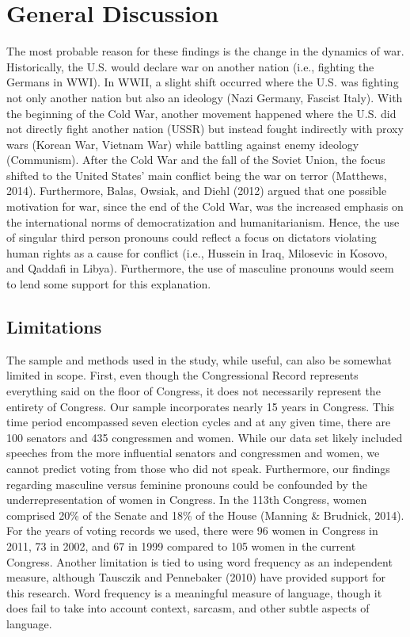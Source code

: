 \documentclass[english,man]{apa6}
\theoremstyle{definition}
\theoremstyle{definition}
\theoremstyle{definition}
\theoremstyle{remark}
\begin{document}
\section{General Discussion}\label{general-discussion}

The most probable reason for these findings is the change in the
dynamics of war. Historically, the U.S. would declare war on another
nation (i.e., fighting the Germans in WWI). In WWII, a slight shift
occurred where the U.S. was fighting not only another nation but also an
ideology (Nazi Germany, Fascist Italy). With the beginning of the Cold
War, another movement happened where the U.S. did not directly fight
another nation (USSR) but instead fought indirectly with proxy wars
(Korean War, Vietnam War) while battling against enemy ideology
(Communism). After the Cold War and the fall of the Soviet Union, the
focus shifted to the United States' main conflict being the war on
terror (Matthews, 2014). Furthermore, Balas, Owsiak, and Diehl (2012)
argued that one possible motivation for war, since the end of the Cold
War, was the increased emphasis on the international norms of
democratization and humanitarianism. Hence, the use of singular third
person pronouns could reflect a focus on dictators violating human
rights as a cause for conflict (i.e., Hussein in Iraq, Milosevic in
Kosovo, and Qaddafi in Libya). Furthermore, the use of masculine
pronouns would seem to lend some support for this explanation.

\subsection{Limitations}\label{limitations}

The sample and methods used in the study, while useful, can also be
somewhat limited in scope. First, even though the Congressional Record
represents everything said on the floor of Congress, it does not
necessarily represent the entirety of Congress. Our sample incorporates
nearly 15 years in Congress. This time period encompassed seven election
cycles and at any given time, there are 100 senators and 435 congressmen
and women. While our data set likely included speeches from the more
influential senators and congressmen and women, we cannot predict voting
from those who did not speak. Furthermore, our findings regarding
masculine versus feminine pronouns could be confounded by the
underrepresentation of women in Congress. In the 113th Congress, women
comprised 20\% of the Senate and 18\% of the House (Manning \& Brudnick,
2014). For the years of voting records we used, there were 96 women in
Congress in 2011, 73 in 2002, and 67 in 1999 compared to 105 women in
the current Congress. Another limitation is tied to using word frequency
as an independent measure, although Tausczik and Pennebaker (2010) have
provided support for this research. Word frequency is a meaningful
measure of language, though it does fail to take into account context,
sarcasm, and other subtle aspects of language.
\end{document}
